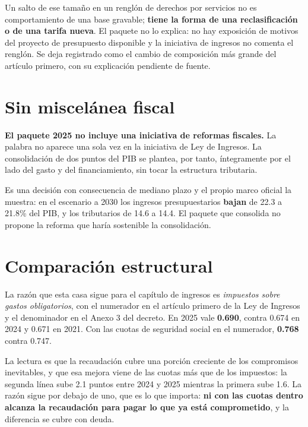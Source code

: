 Un salto de ese tamaño en un renglón de derechos por servicios no es
comportamiento de una base gravable; \textbf{tiene la forma de una
reclasificación o de una tarifa nueva}. El paquete no lo explica: no hay
exposición de motivos del proyecto de presupuesto disponible y la iniciativa de
ingresos no comenta el renglón. Se deja registrado como el cambio de composición
más grande del artículo primero, con su explicación pendiente de fuente.



\section{Sin miscelánea fiscal}

\textbf{El paquete 2025 no incluye una iniciativa de reformas fiscales.} La
palabra no aparece una sola vez en la iniciativa de Ley de Ingresos. La
consolidación de dos puntos del PIB se plantea, por tanto, íntegramente por el
lado del gasto y del financiamiento, sin tocar la estructura tributaria.

Es una decisión con consecuencia de mediano plazo y el propio marco oficial la
muestra: en el escenario a 2030 los ingresos presupuestarios \textbf{bajan} de
22.3 a 21.8\% del PIB, y los tributarios de 14.6 a 14.4. El paquete que consolida
no propone la reforma que haría sostenible la consolidación.

\section{Comparación estructural}



La razón que esta casa sigue para el capítulo de ingresos es \emph{impuestos sobre
gastos obligatorios}, con el numerador en el artículo primero de la Ley de
Ingresos y el denominador en el Anexo 3 del decreto. En 2025 vale \textbf{0.690},
contra 0.674 en 2024 y 0.671 en 2021. Con las cuotas de seguridad social en el
numerador, \textbf{0.768} contra 0.747.

La lectura es que la recaudación cubre una porción creciente de los compromisos
inevitables, y que esa mejora viene de las cuotas más que de los impuestos: la
segunda línea sube 2.1 puntos entre 2024 y 2025 mientras la primera sube 1.6. La
razón sigue por debajo de uno, que es lo que importa: \textbf{ni con las cuotas
dentro alcanza la recaudación para pagar lo que ya está comprometido}, y la
diferencia se cubre con deuda.

\clearpage
